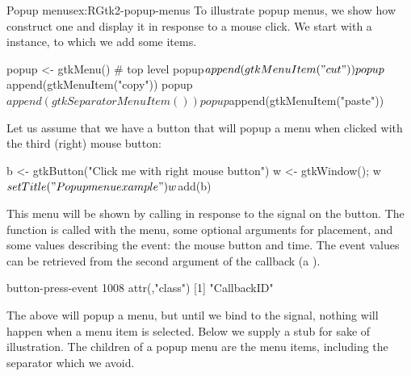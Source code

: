 \begin{example}{Popup menus}{ex:RGtk2-popup-menus}
To illustrate popup menus, we show how construct one and display it in
response to a mouse click. We start with a  instance, to
which we add some items.
\begin{Schunk}
\begin{Sinput}
 popup <- gtkMenu()                       # top level
 popup$append(gtkMenuItem("cut"))
 popup$append(gtkMenuItem("copy"))
 popup$append(gtkSeparatorMenuItem())
 popup$append(gtkMenuItem("paste"))
\end{Sinput}
\end{Schunk}

Let us assume that we have a button that will popup a menu when
clicked with the third (right) mouse button:
\begin{Schunk}
\begin{Sinput}
 b <- gtkButton("Click me with right mouse button")
 w <- gtkWindow(); w$setTitle("Popup menu example")
 w$add(b)
\end{Sinput}
\end{Schunk}

This menu will be shown by calling  in response to
the  signal on the button. The
 function is called with the menu, some
optional arguments for placement, and some values describing the
event: the mouse button and time. The event values can be retrieved from
the second argument of the callback (a ).
\begin{Schunk}
\begin{Soutput}
button-press-event 
              1008 
attr(,"class")
[1] "CallbackID"
\end{Soutput}
\end{Schunk}

The above will popup a menu, but until we bind to the 
signal, nothing will happen when a menu item is selected. Below we
supply a stub for sake of illustration. The children of a popup menu
are the menu items, including the separator which we avoid.
\begin{Schunk}
\end{Schunk}
\end{example}

